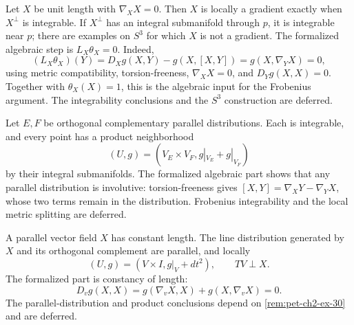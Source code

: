 \begin{remark}
  \label{rem:pet-ch2-ex-29}


  Let $X$ be unit length with $\nabla_XX=0$.
  Then $X$ is locally a gradient exactly when $X^\perp$ is integrable. If
  $X^\perp$ has an integral submanifold through $p$, it is integrable near
  $p$; there are examples on $S^3$ for which $X$ is not a gradient.
  \sketch
  The formalized algebraic step is
  $L_X\theta_X=0$. Indeed,
  \[
    (L_X\theta_X)(Y)
      =D_Xg(X,Y)-g(X,[X,Y])
      =g(X,\nabla_YX)=0,
  \]
  using metric compatibility, torsion-freeness, $\nabla_XX=0$, and
  $D_Yg(X,X)=0$. Together with $\theta_X(X)=1$, this is the algebraic input
  for the Frobenius argument. The integrability conclusions and the $S^3$
  construction are deferred.
\end{remark}

\begin{remark}
  \label{rem:pet-ch2-ex-30}


  Let $E,F$ be orthogonal complementary parallel
  distributions. Each is integrable, and every point has a product
  neighborhood
  \[
    (U,g)=(V_E\times V_F,g|_{V_E}+g|_{V_F})
  \]
  by their integral submanifolds.
  \sketch
  The formalized algebraic part shows that any parallel distribution is
  involutive: torsion-freeness gives
  $[X,Y]=\nabla_XY-\nabla_YX$, whose two terms remain in the distribution.
  Frobenius integrability and the local metric splitting are deferred.
\end{remark}

\begin{remark}
  \label{rem:pet-ch2-ex-31}


  A parallel vector field $X$ has constant
  length. The line distribution generated by $X$ and its orthogonal complement
  are parallel, and locally
  \[
    (U,g)=(V\times I,g|_V+dt^2),
    \qquad TV\perp X.
  \]
  \sketch
  The formalized part is constancy of length:
  \[
    D_vg(X,X)
      =g(\nabla_vX,X)+g(X,\nabla_vX)=0.
  \]
  The parallel-distribution and product conclusions depend on
  \cref{rem:pet-ch2-ex-30} and are deferred.
\end{remark}

